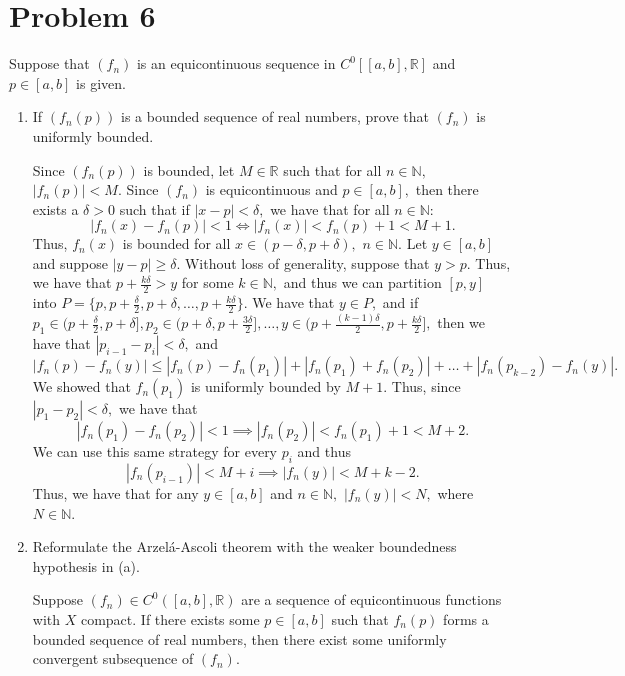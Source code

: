 \documentclass[11pt]{article}
\newcommand{\bbN}{\mathbb{N}}
\newcommand{\bbR}{\mathbb{R}}
\begin{document}
\newpage
\section*{Problem 6}
\begin{problem}
    Suppose that $(f_n)$ is an equicontinuous sequence in $C^0[[a,b], \bbR]$ and $p\in [a,b]$ is given. 
\end{problem}
\begin{enumerate}
    \item 
    \begin{problem}
    If $(f_n(p))$ is a bounded sequence of real numbers, prove that $(f_n)$ is uniformly bounded.        
    \end{problem}
    \begin{solution}
        Since $(f_n(p))$ is bounded, let $M\in \bbR$ such that for all $n\in \bbN,$ $|f_n(p)|<M.$ Since $(f_n)$ is equicontinuous and $p\in [a,b],$ then there exists a $\delta>0$ such that if $|x-p|<\delta,$ we have that for all $n\in \bbN:$
        \[|f_n(x) - f_n(p)|< 1 \iff |f_n(x)| < f_n(p) + 1< M+1.\] Thus, $f_n(x)$ is bounded for all $x\in (p-\delta, p + \delta),$ $n \in \bbN.$ Let $y \in [a,b]$ and suppose $|y-p|\geq \delta.$ Without loss of generality, suppose that $y>p.$ Thus, we have that $p+\frac{k\delta}{2}> y$ for some $k\in \bbN,$ and thus we can partition $[p,y]$ into 
        $P = \{p, p + \frac{\delta}{2}, p + \delta, \dots, p + \frac{k\delta}{2}\}.$ We have that $y \in P,$ and if $p_1 \in (p + \frac{\delta}{2}, p + \delta], p_2 \in (p + \delta, p + \frac{3\delta}{2}], \dots, y \in (p + \frac{(k-1)\delta}{2}, p + \frac{k\delta}{2}],$ then we have that $|p_{i-1} - p_i|< \delta,$ and  
        \[|f_n(p) - f_n(y)| \leq |f_n(p) - f_n(p_1)| + |f_n(p_1) + f_n(p_2)| + \dots + |f_n(p_{k-2}) - f_n(y)|.\] We showed that $f_n(p_1)$ is uniformly bounded by $M+1.$ Thus, since $|p_1 - p_2|<\delta,$ we have that \[|f_n(p_1) - f_n(p_2)|< 1 \implies |f_n(p_2)| < f_n(p_1) + 1 < M+2.\] We can use this same strategy for every $p_i$ and thus 
        \[|f_n(p_{i-1})| < M + i \implies |f_n(y)| < M + k-2.\] Thus, we have that for any $y \in [a,b]$ and $n \in \bbN,$ $|f_n(y)|< N,$ where $N\in \bbN.$ 
    \end{solution}
\item 
\begin{problem}
    Reformulate the Arzel\'{a}-Ascoli theorem with the weaker boundedness hypothesis in (a).
\end{problem}
\begin{solution}
    Suppose $(f_n)\in C^{0}([a,b], \bbR)$ are a sequence of equicontinuous functions with $X$ compact. If there exists some $p \in [a,b]$ such that $f_n(p)$ forms a bounded sequence of real numbers, then there exist some uniformly convergent subsequence of $(f_n).$

\end{solution}
\end{enumerate}
\end{document}
